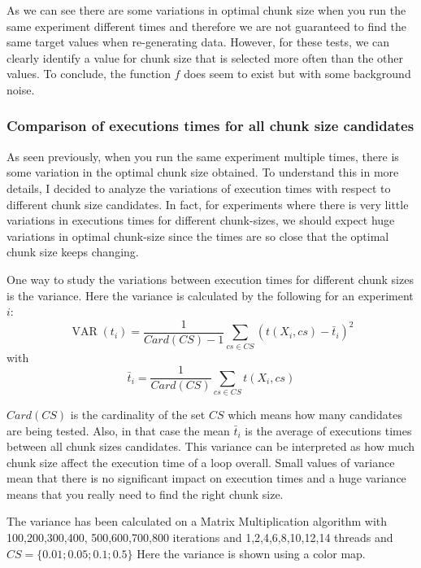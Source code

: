 As we can see there are some variations in optimal chunk size when you run the same experiment different times and therefore we are not guaranteed to find the same target values when re-generating data. However, for these tests, we can clearly identify a value for chunk size that is selected more often than the other values. To conclude, the function $f$ does seem to exist but with some background noise.

\subsubsection{Comparison of executions times for all chunk size candidates}
As seen previously, when you run the same experiment multiple times, there is some variation in the optimal chunk size obtained. To understand this in more details, I decided to analyze the variations of execution times with respect to different chunk size candidates.
 In fact, for experiments where there is very little variations in executions times for different chunk-sizes, we should expect huge variations in optimal chunk-size since the times are so close that the optimal chunk size keeps changing.

One way to study the variations between execution times for different chunk sizes is the variance. Here the variance is calculated by the following for an experiment $i$:
$$\operatorname{VAR}(t_i)=\frac{1}{Card(CS)-1}\sum_{cs \in CS}(t(X_i,cs)-\bar{t}_i)^2$$
with 
$$\bar{t}_i=\frac{1}{Card(CS)}\sum_{cs \in CS}t(X_i,cs)$$

 $Card(CS)$ is the cardinality of the set $CS$ which means how many candidates are being tested. Also, in that case the mean $\bar{t}_i$ is the average of executions times between all chunk sizes candidates. This variance can be interpreted as how much chunk size affect the execution time of a loop overall. Small values of variance mean that there is no significant impact on execution times and a huge variance means that you really need to find the right chunk size.

The variance has been calculated on a Matrix Multiplication algorithm with 100,200,300,400, 500,600,700,800 iterations and 1,2,4,6,8,10,12,14 threads and $CS=\{0.01;0.05;0.1;0.5\}$
Here the variance is shown using a color map.

